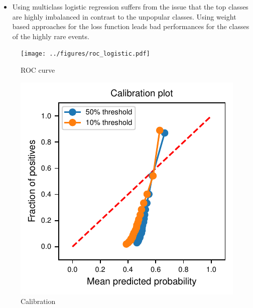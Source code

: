 \documentclass{article}
\begin{document}
\begin{itemize}
  \item Using multiclass logistic regression suffers from the issue that the top classes are highly imbalanced in contrast to the unpopular classes. Using weight based approaches for the loss function leads bad performances for the classes of the highly rare events. 
\end{itemize}

\begin{figure}
  \centering
  \texttt{[image: ../figures/roc\_logistic.pdf]}
  \caption{ROC curve}
  \label{fig:roc_curve}
\end{figure}

\begin{figure}
  \centering
  \includegraphics[width=\textwidth]{../figures/calibration_combined.pdf}
  \caption{Calibration}
  \label{fig:calibration}
\end{figure}
\end{document}
